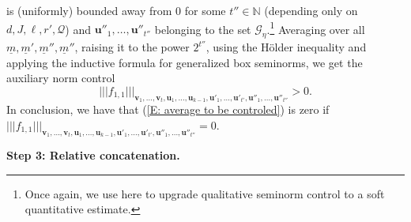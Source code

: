\documentclass[11pt]{amsart}
\theoremstyle{definition}
\newcommand{\N}{{\mathbb N}}
\newcommand{\CG}{{\mathcal G}}
\newcommand{\CQ}{{\mathcal Q}}
\newcommand{\bu}{{\mathbf{u}}}
\newcommand{\bv}{{\mathbf{v}}}
\newcommand{\um}{{\underline{m}}}
\newcommand{\nnorm}[1]{\lvert\!|\!| #1|\!|\!\rvert}
\newcommand{\1}{{\mathbf{1}}}
\begin{document}
           is (uniformly) bounded away from 0
         for some $t''\in\N$ (depending only on $d,J,\ell,r',\CQ$) and $\bu''_{1},\dots,\bu''_{t''}$ belonging to the set $\CG_{\eta}$.\footnote{Once again, we use here \cite[Proposition A.2]{FrKu22a} to upgrade qualitative seminorm control to a soft quantitative estimate.}
   Averaging over all $\um,\um',\um'',\um''$, raising it to the power $2^{t''}$, using the H{\"o}lder inequality and applying the inductive formula for generalized box seminorms, we get the auxiliary norm control
       $$\nnorm{f_{1,1}}_{\bv_{1},\dots,\bv_{t},\bu_{1},\dots,\bu_{k-1},\bu'_{1},\dots,\bu'_{t'},\bu''_{1},\dots,\bu''_{t''}}>0.$$
     In conclusion, we have that  (\ref{E: average to be controled}) is zero if $\nnorm{f_{1,1}}_{\bv_{1},\dots,\bv_{t},\bu_{1},\dots,\bu_{k-1},\bu'_{1},\dots,\bu'_{t'},\bu''_{1},\dots,\bu''_{t''}}=0$.

    \smallskip
      \textbf{Step 3: Relative concatenation.} 
      \smallskip
\end{document}

